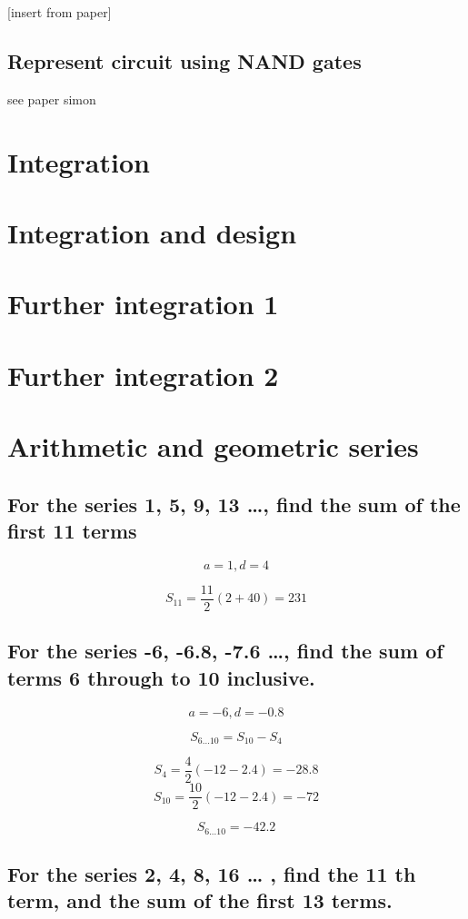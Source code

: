 \documentclass[12pt]{article}
\begin{document}
[insert from paper]

\subsection{Represent circuit using NAND gates}

see paper simon

\section{Integration}

\section{Integration and design}

\section{Further integration 1}

\section{Further integration 2}

\section{Arithmetic and geometric series}

\subsection{For the series 1, 5, 9, 13 …, find the sum of the first 11 terms}

\[a=1, d=4\]

\[S_{11} = \frac{11}{2}(2+40)=231\]

\subsection{For the series -6, -6.8, -7.6 …, find the sum of terms 6 through to 10
inclusive.}

\[a=-6, d=-0.8\]

\[S_{6...10} = S_{10}-S_4\]

\[S_4=\frac{4}{2}(-12-2.4)=-28.8\]
\[S_{10}=\frac{10}{2}(-12-2.4)=-72\]

\[S_{6...10} = -42.2\]

\subsection{For the series 2, 4, 8, 16 … , find the 11
th term, and the sum of the first 13
terms.}
\end{document}
